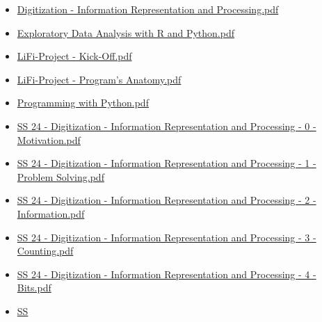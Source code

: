 \documentclass[
  letterpaper,
  DIV=11]{scrartcl}
\providecommand{\tightlist}{%
  \setlength{\itemsep}{0pt}\setlength{\parskip}{0pt}}\usepackage{longtable,booktabs,array}
\begin{document}
\begin{itemize}
\tightlist
\item
  \href{google_slides/wirtschaftsinformatik/Digitization\%20-\%20Information\%20Representation\%20and\%20Processing.pdf}{Digitization
  - Information Representation and Processing.pdf}
\item
  \href{google_slides/wirtschaftsinformatik/Exploratory\%20Data\%20Analysis\%20with\%20R\%20and\%20Python.pdf}{Exploratory
  Data Analysis with R and Python.pdf}
\item
  \href{google_slides/wirtschaftsinformatik/LiFi-Project\%20-\%20Kick-Off.pdf}{LiFi-Project
  - Kick-Off.pdf}
\item
  \href{google_slides/wirtschaftsinformatik/LiFi-Project\%20-\%20Program's\%20Anatomy.pdf}{LiFi-Project
  - Program's Anatomy.pdf}
\item
  \href{google_slides/wirtschaftsinformatik/Programming\%20with\%20Python.pdf}{Programming
  with Python.pdf}
\item
  \href{google_slides/wirtschaftsinformatik/SS\%2024\%20-\%20Digitization\%20-\%20Information\%20Representation\%20and\%20Processing\%20-\%200\%20-\%20Motivation.pdf}{SS
  24 - Digitization - Information Representation and Processing - 0 -
  Motivation.pdf}
\item
  \href{google_slides/wirtschaftsinformatik/SS\%2024\%20-\%20Digitization\%20-\%20Information\%20Representation\%20and\%20Processing\%20-\%201\%20-\%20Problem\%20Solving.pdf}{SS
  24 - Digitization - Information Representation and Processing - 1 -
  Problem Solving.pdf}
\item
  \href{google_slides/wirtschaftsinformatik/SS\%2024\%20-\%20Digitization\%20-\%20Information\%20Representation\%20and\%20Processing\%20-\%202\%20-\%20Information.pdf}{SS
  24 - Digitization - Information Representation and Processing - 2 -
  Information.pdf}
\item
  \href{google_slides/wirtschaftsinformatik/SS\%2024\%20-\%20Digitization\%20-\%20Information\%20Representation\%20and\%20Processing\%20-\%203\%20-\%20Counting.pdf}{SS
  24 - Digitization - Information Representation and Processing - 3 -
  Counting.pdf}
\item
  \href{google_slides/wirtschaftsinformatik/SS\%2024\%20-\%20Digitization\%20-\%20Information\%20Representation\%20and\%20Processing\%20-\%204\%20-\%20Bits.pdf}{SS
  24 - Digitization - Information Representation and Processing - 4 -
  Bits.pdf}
\item
  \href{google_slides/wirtschaftsinformatik/SS\%2024\%20-\%20Digitization\%20-\%20Information\%20Representation\%20and\%20Processing\%20-\%205\%20-\%20Codes.pdf}{SS
}
\end{itemize}
\end{document}

